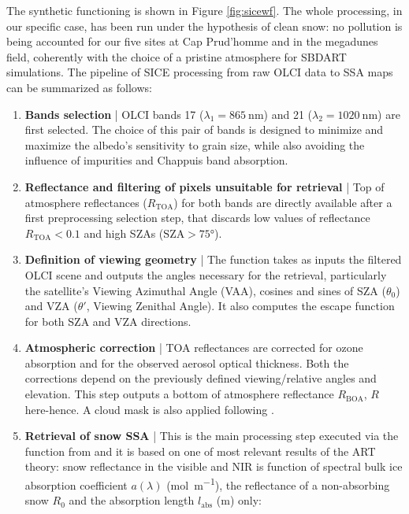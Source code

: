 \documentclass[11pt,a4paper]{article}
\let\oldtexttt\texttt
\renewcommand{\texttt}[1]{\tcbox[boxsep=1pt, left=2pt, right=2pt]{\oldtexttt{#1}}}
\newcommand{\sza}{\mathrm{SZA}}
\begin{document}
The synthetic functioning is shown in Figure \ref{fig:sicewf}. The whole processing, in our specific case, has been run under the hypothesis of clean snow: no pollution is being accounted for our five sites at Cap Prud'homme and in the megadunes field, coherently with the choice of a pristine atmosphere for SBDART simulations. The pipeline of SICE processing from raw OLCI data to SSA maps can be summarized as follows:
\begin{enumerate}[align=right,itemindent=2em,labelsep=4pt,labelwidth=1em,leftmargin=0pt,nosep]
	\item \textbf{Bands selection} |
OLCI bands 17 ($\lambda_1 = \qty{865}{\nano\meter}$) and 21 ($\lambda_2 = \qty{1020}{\nano\meter}$) are first selected. The choice of this pair of bands is designed to minimize and maximize the albedo's sensitivity to grain size, while also avoiding the influence of impurities and Chappuis band absorption.
	\item \textbf{Reflectance and filtering of pixels unsuitable for retrieval} |
Top of atmosphere reflectances ($R_\mathrm{TOA}$) for both bands are directly available after a first preprocessing selection step, that discards low values of reflectance $R_\mathrm{TOA} < 0.1$ and high SZAs ($\sza > \ang{75}$). 
\item \textbf{Definition of viewing geometry} |
The function \texttt{sice\_lib.view\_geometry()} takes as inputs the filtered OLCI scene and outputs the angles necessary for the retrieval, particularly the satellite's Viewing Azimuthal Angle (VAA), cosines and sines of SZA ($\theta_0$) and VZA ($\theta'$, Viewing Zenithal Angle). It also computes the escape function for both SZA and VZA directions.
	\item \textbf{Atmospheric correction} |
TOA reflectances are corrected for ozone absorption and for the observed aerosol optical thickness. Both the corrections depend on the previously defined viewing/relative angles and elevation. This step outputs a bottom of atmosphere reflectance $R_\mathrm{BOA}$, $R$ here-hence. A cloud mask is also applied following \cite{poulsenEvaluationComparisonMachine2020}.
\item \textbf{Retrieval of snow SSA} |
This is the main processing step executed via the \texttt{snow\_properties()} function from \texttt{sice\_lib} and it is based on one of most relevant results of the ART theory: snow reflectance in the visible and NIR is function of spectral bulk ice absorption coefficient $a(\lambda)$ (\unit{\mol\per\meter}), the reflectance of a non-absorbing snow $R_0$ and the absorption length $l_\mathrm{abs}$ (\unit{\meter}) only:

\end{enumerate}
\end{document}
